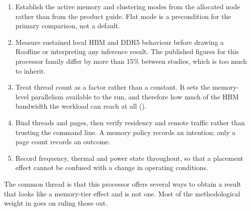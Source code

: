 \begin{enumerate}
  \item Establish the active memory and clustering modes from the
        allocated node rather than from the product guide.  Flat mode is
        a precondition for the primary comparison, not a default.
  \item Measure sustained local HBM and DDR5 behaviour before drawing a
        Roofline or interpreting any inference result.  The published
        figures for this processor family differ by more than 15\%
        between studies, which is too much to inherit.
  \item Treat thread count as a factor rather than a constant.  It sets
        the memory-level parallelism available to the run, and therefore
        how much of the HBM bandwidth the workload can reach at all
        ().
  \item Bind threads and pages, then verify residency and remote traffic
        rather than trusting the command line.  A memory policy records
        an intention; only a page count records an outcome.
  \item Record frequency, thermal and power state throughout, so that a
        placement effect cannot be confused with a change in operating
        conditions.
\end{enumerate}

The common thread is that this processor offers several ways to obtain a
result that looks like a memory-tier effect and is not one.  Most of the
methodological weight in  goes on ruling those
out.
